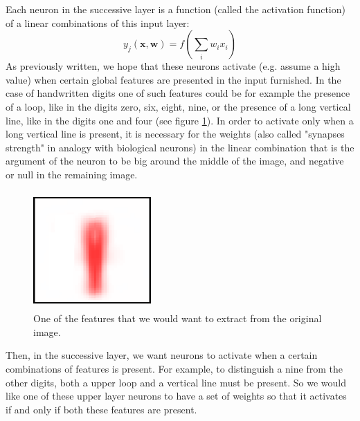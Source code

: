 \documentclass[a4paper]{report}
\begin{document}
Each neuron in the successive layer is a function (called the activation function) of a linear combinations of this input layer:
\begin{equation}
y_j(\textbf{x}, \textbf{w}) = f (\sum_i w_i x_i)
\end{equation}
As previously written, we hope that these neurons activate (e.g.
assume a high value) when certain global features are presented in the input furnished.
In the case of handwritten digits one of such features could be for example the presence of a loop, like in the digits zero, six, eight, nine, or the presence of a long vertical line, like in the digits one and four (see figure \ref{feat}).
In order to activate only when a long vertical line is present, it is necessary for the weights (also called "synapses strength" in analogy with biological neurons) in the linear combination that is the argument of the neuron to be big around the middle of the image, and negative or null in the remaining image.
\begin{figure} [H]
\centering
\includegraphics [height=4.5cm ,width=4.5cm ] {o/nine.png}
\caption{One of the features that we would want to extract from the original image.}
\label{feat}
\end{figure}
Then, in the successive layer, we want neurons to activate when a certain combinations of features is present.
For example, to distinguish a nine from the other digits, both a upper loop and a vertical line must be present.
So we would like one of these upper layer neurons to have a set of weights so that it activates if and only if both these features are present.
\end{document}
